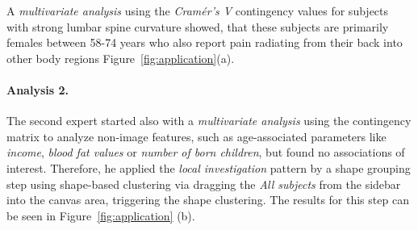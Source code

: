 \documentclass[journal]{style/vgtc} 			          %
\newcommand{\com}[1]{\textcolor{orange}{\uline{#1}}}
\begin{document}
A \emph{multivariate analysis} using the \emph{Cram\'{e}r's V} contingency values for subjects with strong lumbar spine curvature showed, that these subjects are primarily females between 58-74 years who also report pain radiating from their back into other body regions Figure~\ref{fig:application}(a).
%
%
\paragraph{Analysis 2.}
%
The second expert started also with a \emph{multivariate analysis} using the contingency matrix to analyze non-image features, such as age-associated parameters like \emph{income}, \emph{blood fat values} or \emph{number of born children}, but found no associations of interest.
%
Therefore, he applied the \emph{local investigation} pattern by a shape grouping step using shape-based clustering via dragging the \emph{All subjects} from the sidebar into the canvas area, triggering the shape clustering.
%
The results for this step can be seen in Figure~\ref{fig:application} (b).
\end{document}
